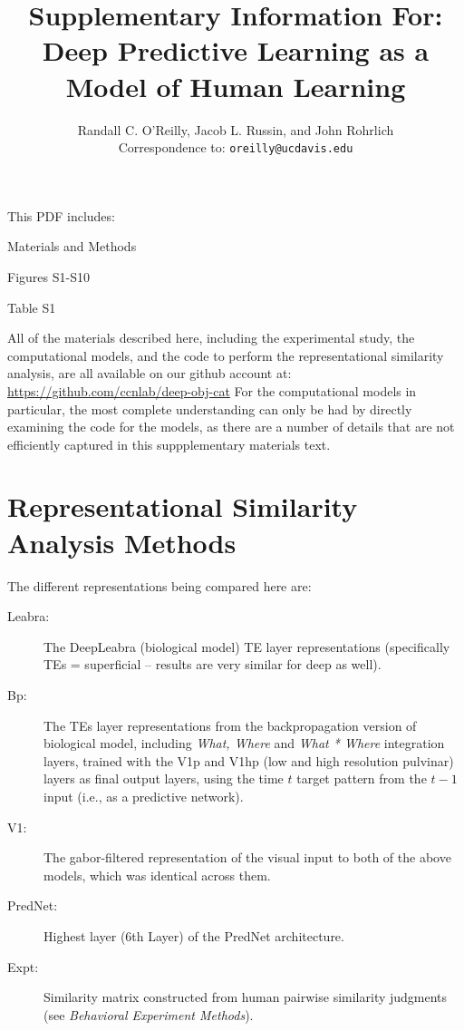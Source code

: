 \documentclass[12pt,twoside]{naturefigs}
\title{ Supplementary Information For:\\
Deep Predictive Learning as a Model of Human Learning }
\author{Randall C. O'Reilly, Jacob L. Russin, and John Rohrlich\\
  Correspondence to: \texttt{oreilly@ucdavis.edu}\\}
\newif\myifpdf
\begin{document}
\sloppy
\raggedbottom

\maketitle 

\noindent This PDF includes:
\begin{description}
\item Materials and Methods
\item Figures S1-S10
\item Table S1
\end{description}

\clearpage

\pagestyle{myheadings}

All of the materials described here, including the experimental study, the computational models, and the code to perform the representational similarity analysis, are all available on our github account at: \url{https://github.com/ccnlab/deep-obj-cat}  For the computational models in particular, the most complete understanding can only be had by directly examining the code for the models, as there are a number of details that are not efficiently captured in this suppplementary materials text.

\section{Representational Similarity Analysis Methods}

The different representations being compared here are:
\begin{description}
\item[Leabra:] The DeepLeabra (biological model) TE layer representations (specifically TEs = superficial -- results are very similar for deep as well).
\item[Bp:] The TEs layer representations from the backpropagation version of biological model, including {\em What, Where} and {\em What * Where} integration layers, trained with the V1p and V1hp (low and high resolution pulvinar) layers as final output layers, using the time $t$ target pattern from the $t-1$ input (i.e., as a predictive network).
\item[V1:] The gabor-filtered representation of the visual input to both of the above models, which was identical across them.
\item[PredNet:] Highest layer (6th Layer) of the PredNet architecture.

\item[Expt:] Similarity matrix constructed from human pairwise similarity judgments (see {\em Behavioral Experiment Methods}).
\end{description}
\end{document}
